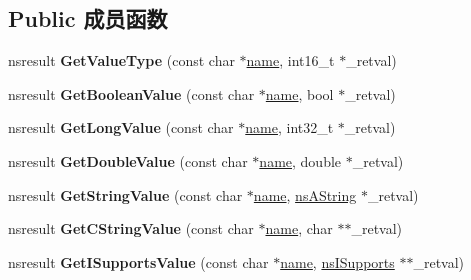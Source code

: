 \subsection*{Public 成员函数}
\begin{DoxyCompactItemize}
\item 
\mbox{\label{interfacens_i_command_params_a2950022295c8b208d1bdc0d58c187fae}} 
nsresult {\bfseries Get\+Value\+Type} (const char $\ast$\hyperlink{structname}{name}, int16\+\_\+t $\ast$\+\_\+retval)
\item 
\mbox{\label{interfacens_i_command_params_af858fa479d6c3c94aff74a44dc605488}} 
nsresult {\bfseries Get\+Boolean\+Value} (const char $\ast$\hyperlink{structname}{name}, bool $\ast$\+\_\+retval)
\item 
\mbox{\label{interfacens_i_command_params_a635fa8c762c8d9d81253f044e3dbf749}} 
nsresult {\bfseries Get\+Long\+Value} (const char $\ast$\hyperlink{structname}{name}, int32\+\_\+t $\ast$\+\_\+retval)
\item 
\mbox{\label{interfacens_i_command_params_a02d4ec15d14e87a24a1b336a18ddf28b}} 
nsresult {\bfseries Get\+Double\+Value} (const char $\ast$\hyperlink{structname}{name}, double $\ast$\+\_\+retval)
\item 
\mbox{\label{interfacens_i_command_params_a489bdbc28d9115455d4c1d23aa0663c9}} 
nsresult {\bfseries Get\+String\+Value} (const char $\ast$\hyperlink{structname}{name}, \hyperlink{structns_string_container}{ns\+A\+String} $\ast$\+\_\+retval)
\item 
\mbox{\label{interfacens_i_command_params_a1f6f3f4c8566ddb5b63d31429a1cfc31}} 
nsresult {\bfseries Get\+C\+String\+Value} (const char $\ast$\hyperlink{structname}{name}, char $\ast$$\ast$\+\_\+retval)
\item 
\mbox{\label{interfacens_i_command_params_a5d5fa6345d91e442884137201ead2c2c}} 
nsresult {\bfseries Get\+I\+Supports\+Value} (const char $\ast$\hyperlink{structname}{name}, \hyperlink{interfacens_i_supports}{ns\+I\+Supports} $\ast$$\ast$\+\_\+retval)
\item 

\end{DoxyCompactItemize}
